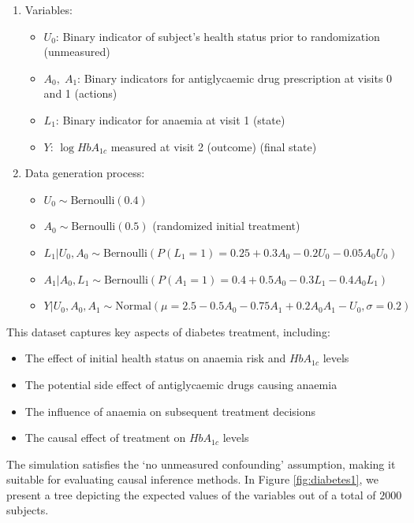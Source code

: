 \begin{enumerate}
    \item Variables:
    \begin{itemize}
        \item $U_0$: Binary indicator of subject's health status
        prior to randomization (unmeasured)
        \item $A_0,\; A_1$: Binary indicators for antiglycaemic
        drug prescription at visits 0 and 1 (actions)
        \item $L_1$: Binary indicator for anaemia at visit 1 (state)
        \item $Y$: $\log HbA_{1c}$ measured at visit 2 (outcome) (final state)
    \end{itemize}

    \item Data generation process:
    \begin{itemize}
        \item $U_0 \sim \text{Bernoulli}(0.4)$
        \item $A_0 \sim \text{Bernoulli}(0.5)$ (randomized initial treatment)
        \item $L_1 | U_0, A_0 \sim \text{Bernoulli}(P(L_1 = 1) = 0.25 + 0.3A_0 - 0.2U_0 - 0.05A_0U_0)$
        \item $A_1 | A_0, L_1 \sim \text{Bernoulli}(P(A_1 = 1) = 0.4 + 0.5A_0 - 0.3L_1 - 0.4A_0L_1)$
        \item $Y | U_0, A_0, A_1 \sim \text{Normal}(\mu = 2.5 - 0.5A_0 - 0.75A_1 + 0.2A_0A_1 - U_0, \sigma = 0.2)$
    \end{itemize}
\end{enumerate}
This dataset captures key aspects of diabetes treatment, including:
\begin{itemize}
    \item The effect of initial health status on anaemia risk
    and $HbA_{1c}$ levels
    \item The potential side effect of antiglycaemic drugs causing anaemia
    \item The influence of anaemia on subsequent treatment decisions
    \item The causal effect of treatment on $HbA_{1c}$ levels
\end{itemize}
The simulation satisfies the `no unmeasured confounding' assumption,
making it suitable for evaluating causal inference methods.
In Figure \ref{fig:diabetes1}, we present a tree
depicting the expected values of the variables out of
a total of $2000$ subjects.

